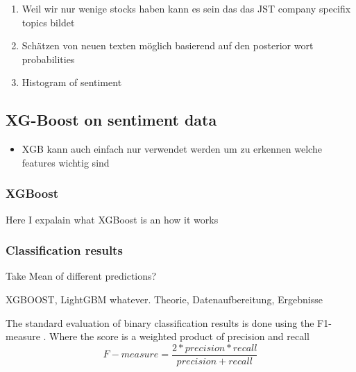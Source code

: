 \begin{enumerate}
    \item Weil wir nur wenige stocks haben kann es sein das das JST company specifix topics bildet
    \item Schätzen von neuen texten möglich basierend auf den posterior wort probabilities
    \item Histogram of sentiment
\end{enumerate}




\subsection{XG-Boost on sentiment data}
\begin{itemize}
    \item XGB kann auch einfach nur verwendet werden um zu erkennen welche features wichtig sind
\end{itemize}
\subsubsection{XGBoost}
Here I expalain what XGBoost is an how it works

\subsubsection{Classification results}
Take Mean of different predictions?

XGBOOST, LightGBM whatever. 
Theorie, Datenaufbereitung, Ergebnisse


The standard evaluation of binary classification results is done using the F1-measure \citep{HADDI201326}. Where the score is a weighted product of precision and recall
\begin{equation}
    F-measure = \frac{2*precision * recall}{precision + recall}
\end{equation}
